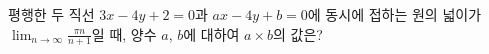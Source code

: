 평행한 두 직선 $3x - 4y + 2 = 0$과 $ax - 4y + b = 0$에 동시에 접하는 원의 넓이가 $\displaystyle\lim_{n\to\infty}\frac{\pi n}{n+1}$일 때, 양수 $a$, $b$에 대하여 $a \times b$의 값은?

